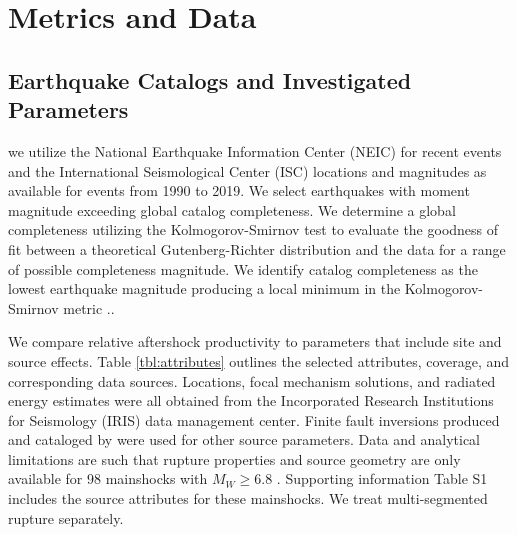 \documentclass[draft, jgrga]{agujournal2018}
\begin{document}
\section{Metrics and Data}
   
\subsection{Earthquake Catalogs and Investigated Parameters}

 we utilize the National Earthquake Information Center (NEIC) for recent events and the International Seismological Center (ISC) locations and magnitudes as available for events from 1990 to 2019. We select earthquakes with moment magnitude exceeding global catalog completeness. We determine a global completeness utilizing the Kolmogorov-Smirnov test to evaluate the goodness of fit between a theoretical Gutenberg-Richter distribution and the data for a range of possible completeness magnitude. We identify catalog completeness as the lowest earthquake magnitude producing a local minimum in the Kolmogorov-Smirnov metric \citep[following][]{Clauset2009Power-lawData, Goebel2017WhatExperiments}.. 


We compare relative aftershock productivity to parameters that include site and source effects. Table \ref{tbl:attributes} outlines the selected attributes, coverage, and corresponding data sources. Locations, focal mechanism solutions, and radiated energy estimates were all obtained from the Incorporated Research Institutions for Seismology (IRIS) data management center. Finite fault inversions produced and cataloged by \citet{Hayes2017} were used for other source parameters. Data and analytical limitations are such that rupture properties and source geometry are only available for 98 mainshocks with $M_W\ge6.8$ \citep{Hayes2017}. Supporting information Table S1 includes the source attributes for these mainshocks. We treat multi-segmented rupture separately.
\end{document}
